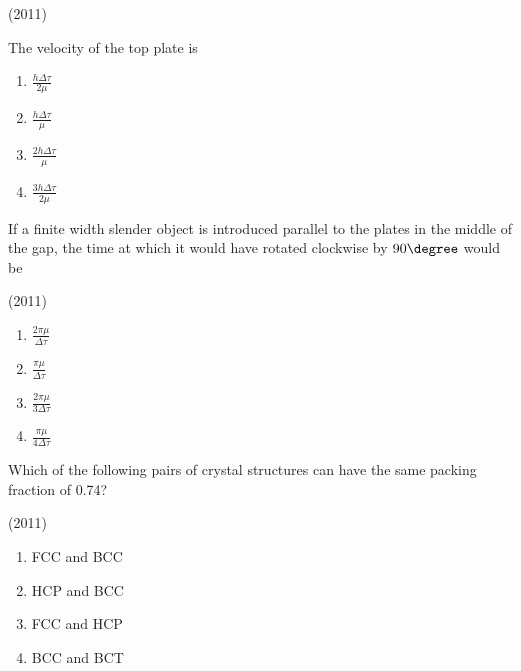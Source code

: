     \hfill{(2011)}

    \item The velocity of the top plate is

        \begin{multicols}{4}
            \begin{enumerate}
                \item $\frac{h\Delta\tau}{2\mu}$
                \item $\frac{h\Delta\tau}{\mu}$
                \item $\frac{2h\Delta\tau}{\mu}$
                \item $\frac{3h\Delta\tau}{2\mu}$
            \end{enumerate}
        \end{multicols}


    \item If a finite width slender object is introduced parallel to the plates in the middle of the gap, the time at which it would have rotated clockwise by $90\degree$ would be
    
    \hfill{(2011)}
    
	\begin{multicols}{4}
		\begin{enumerate}
                \item $\frac{2\pi\mu}{\Delta\tau}$
                \item $\frac{\pi\mu}{\Delta\tau}$
                \item $\frac{2\pi\mu}{3\Delta\tau}$
                \item $\frac{\pi\mu}{4\Delta\tau}$
			\end{enumerate}
		\end{multicols}

    \item Which of the following pairs of crystal structures can have the same packing fraction of 0.74?
    
    \hfill{(2011)}

    \begin{multicols}{4}
       \begin{enumerate}
            \item FCC and BCC
            \item HCP and BCC
            \item FCC and HCP
            \item BCC and BCT
        \end{enumerate}
    \end{multicols}
  
